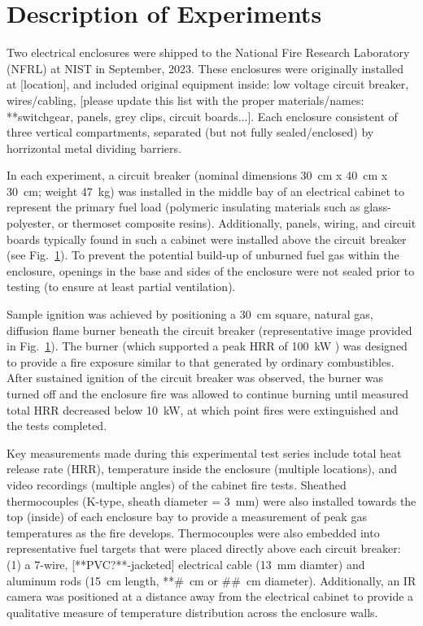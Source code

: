 \documentclass[12pt]{article}
\begin{document}
\section{Description of Experiments}


Two electrical enclosures were shipped to the National Fire Research Laboratory (NFRL) at NIST in September, 2023. These enclosures were originally installed at [location], and included original equipment inside: low voltage circuit breaker, wires/cabling, [please update this list with the proper materials/names: **switchgear, panels, grey clips, circuit boards...]. Each enclosure consistent of three vertical compartments, separated (but not fully sealed/enclosed) by horrizontal metal dividing barriers.

In each experiment, a circuit breaker (nominal dimensions 30~cm x 40~cm x 30~cm; weight 47~kg) was installed in the middle bay of an electrical cabinet to represent the primary fuel load (polymeric insulating materials such as glass-polyester, or thermoset composite resins). Additionally, panels, wiring, and circuit boards typically found in such a cabinet were installed above the circuit breaker (see Fig.~\ref{}). To prevent the potential build-up of unburned fuel gas within the enclosure, openings in the base and sides of the enclosure were not sealed prior to testing (to ensure at least partial ventilation).

Sample ignition was achieved by positioning a 30~cm square, natural gas, diffusion flame burner beneath the circuit breaker (representative image provided in Fig.~\ref{}). The burner (which supported a peak HRR of 100~kW ) was designed to provide a fire exposure similar to that generated by ordinary combustibles\cite{}. After sustained ignition of the circuit breaker was observed, the burner was turned off and the enclosure fire was allowed to continue burning until measured total HRR decreased below 10~kW, at which point fires were extinguished and the tests completed.

Key measurements made during this experimental test series include total heat release rate (HRR), temperature inside the enclosure (multiple locations), and video recordings (multiple angles) of the cabinet fire tests. Sheathed thermocouples (K-type, sheath diameter = 3~mm) were also installed towards the top (inside) of each enclosure bay to provide a measurement of peak gas temperatures as the fire develops. Thermocouples were also embedded into representative fuel targets that were placed directly above each circuit breaker: (1) a 7-wire, [**PVC?**-jacketed] electrical cable (13~mm diamter) and aluminum rods (15~cm length, **\#~cm or \#\#~cm diameter). Additionally, an IR camera was positioned at a distance away from the electrical cabinet to provide a qualitative measure of temperature distribution across the enclosure walls.
\end{document}

